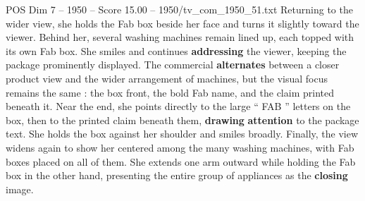 \begin{textsample}{POS Dim 7 – 1950 – Score 15.00 – 1950/tv\_com\_1950\_51.txt}
Returning to the wider view, she holds the Fab box beside her face and turns it slightly toward the viewer.
Behind her, several washing machines remain lined up, each topped with its own Fab box.
She smiles and continues \textbf{addressing} the viewer, keeping the package prominently displayed.
The commercial \textbf{alternates} between a closer product view and the wider arrangement of machines, but the visual focus remains the same : the box front, the bold Fab name, and the claim printed beneath it.
Near the end, she points directly to the large “ FAB ” letters on the box, then to the printed claim beneath them, \textbf{drawing} \textbf{attention} to the package text.
She holds the box against her shoulder and smiles broadly.
Finally, the view widens again to show her centered among the many washing machines, with Fab boxes placed on all of them.
She extends one arm outward while holding the Fab box in the other hand, presenting the entire group of appliances as the \textbf{closing} image.

\end{textsample}
